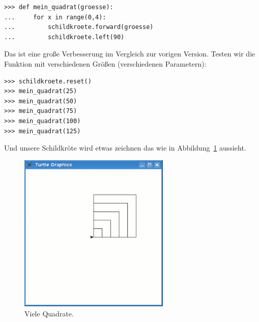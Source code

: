 \begin{Verbatim}[frame=single]
>>> def mein_quadrat(groesse):
...     for x in range(0,4):
...         schildkroete.forward(groesse)
...         schildkroete.left(90)
\end{Verbatim}

Das ist eine große Verbesserung im Vergleich zur vorigen Version. Testen wir die Funktion mit verschiedenen Größen (verschiedenen Parametern):

\begin{Verbatim}[frame=single]
>>> schildkroete.reset()
>>> mein_quadrat(25)
>>> mein_quadrat(50)
>>> mein_quadrat(75)
>>> mein_quadrat(100)
>>> mein_quadrat(125)
\end{Verbatim}

Und unsere Schildkröte wird etwas zeichnen das wie in Abbildung~\ref{fig26} aussieht.

\begin{figure}
\begin{center}
\includegraphics[width=72mm]{images/figure26}
\end{center}
\caption{Viele Quadrate.}\label{fig26}
\end{figure}

